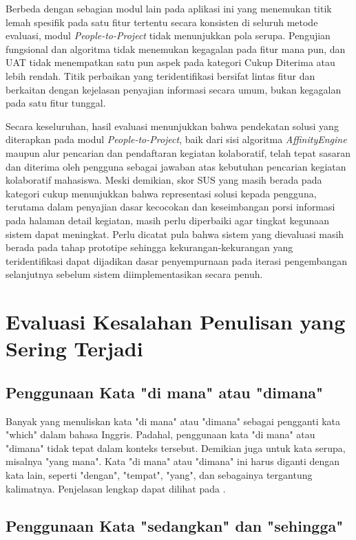 Berbeda dengan sebagian modul lain pada aplikasi ini yang menemukan titik lemah spesifik pada satu fitur tertentu secara konsisten di seluruh metode evaluasi, modul \emph{People-to-Project} tidak menunjukkan pola serupa. Pengujian fungsional dan algoritma tidak menemukan kegagalan pada fitur mana pun, dan UAT tidak menempatkan satu pun aspek pada kategori Cukup Diterima atau lebih rendah. Titik perbaikan yang teridentifikasi bersifat lintas fitur dan berkaitan dengan kejelasan penyajian informasi secara umum, bukan kegagalan pada satu fitur tunggal.

Secara keseluruhan, hasil evaluasi menunjukkan bahwa pendekatan solusi yang diterapkan pada modul \emph{People-to-Project}, baik dari sisi algoritma \emph{AffinityEngine} maupun alur pencarian dan pendaftaran kegiatan kolaboratif, telah tepat sasaran dan diterima oleh pengguna sebagai jawaban atas kebutuhan pencarian kegiatan kolaboratif mahasiswa. Meski demikian, skor SUS yang masih berada pada kategori cukup menunjukkan bahwa representasi solusi kepada pengguna, terutama dalam penyajian dasar kecocokan dan keseimbangan porsi informasi pada halaman detail kegiatan, masih perlu diperbaiki agar tingkat kegunaan sistem dapat meningkat. Perlu dicatat pula bahwa sistem yang dievaluasi masih berada pada tahap prototipe sehingga kekurangan-kekurangan yang teridentifikasi dapat dijadikan dasar penyempurnaan pada iterasi pengembangan selanjutnya sebelum sistem diimplementasikan secara penuh.

\iffalse
\section{Evaluasi Kesalahan Penulisan yang Sering Terjadi}
\subsection{Penggunaan Kata "di mana" atau "dimana"}
Banyak yang menuliskan kata "di mana" atau "dimana" sebagai pengganti kata "which" dalam bahasa Inggris.
Padahal, penggunaan kata "di mana" atau "dimana" tidak tepat dalam konteks tersebut. Demikian juga untuk kata serupa, misalnya "yang mana".
Kata "di mana" atau "dimana" ini harus diganti dengan kata lain, seperti "dengan", "tempat", "yang", dan sebagainya tergantung kalimatnya.
Penjelasan lengkap dapat dilihat pada \autocite{BPBI}.

\subsection{Penggunaan Kata "sedangkan" dan "sehingga"}

